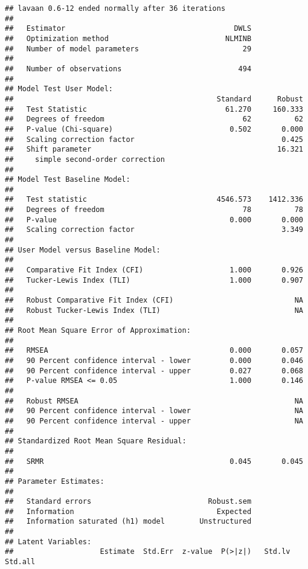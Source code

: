 \documentclass[
]{article}
\begin{document}
\begin{verbatim}
## lavaan 0.6-12 ended normally after 36 iterations
## 
##   Estimator                                       DWLS
##   Optimization method                           NLMINB
##   Number of model parameters                        29
## 
##   Number of observations                           494
## 
## Model Test User Model:
##                                               Standard      Robust
##   Test Statistic                                61.270     160.333
##   Degrees of freedom                                62          62
##   P-value (Chi-square)                           0.502       0.000
##   Scaling correction factor                                  0.425
##   Shift parameter                                           16.321
##     simple second-order correction                                
## 
## Model Test Baseline Model:
## 
##   Test statistic                              4546.573    1412.336
##   Degrees of freedom                                78          78
##   P-value                                        0.000       0.000
##   Scaling correction factor                                  3.349
## 
## User Model versus Baseline Model:
## 
##   Comparative Fit Index (CFI)                    1.000       0.926
##   Tucker-Lewis Index (TLI)                       1.000       0.907
##                                                                   
##   Robust Comparative Fit Index (CFI)                            NA
##   Robust Tucker-Lewis Index (TLI)                               NA
## 
## Root Mean Square Error of Approximation:
## 
##   RMSEA                                          0.000       0.057
##   90 Percent confidence interval - lower         0.000       0.046
##   90 Percent confidence interval - upper         0.027       0.068
##   P-value RMSEA <= 0.05                          1.000       0.146
##                                                                   
##   Robust RMSEA                                                  NA
##   90 Percent confidence interval - lower                        NA
##   90 Percent confidence interval - upper                        NA
## 
## Standardized Root Mean Square Residual:
## 
##   SRMR                                           0.045       0.045
## 
## Parameter Estimates:
## 
##   Standard errors                           Robust.sem
##   Information                                 Expected
##   Information saturated (h1) model        Unstructured
## 
## Latent Variables:
##                    Estimate  Std.Err  z-value  P(>|z|)   Std.lv  Std.all

\end{verbatim}
\end{document}
